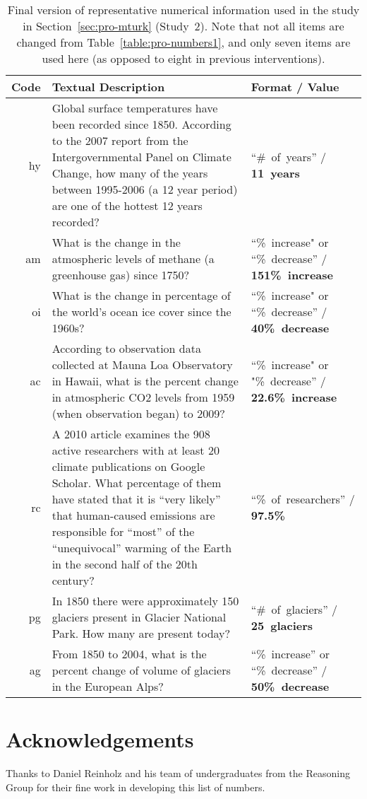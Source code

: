 \begin{table}
    \caption{Final version of representative numerical information used in the study in
        Section~\ref{sec:pro-mturk} (Study~2). Note that not all items are changed from
        Table~\ref{table:pro-numbers1}, and only seven items are used here (as
        opposed to eight in previous interventions).}
    \label{table:pro-numbers2}
    \begin{tabu}{>{\sffamily}rX[3]X[-1,l]}
        \toprule
        Code & Textual Description & Format / Value \\
        \midrule

hy &
Global surface temperatures have been recorded since 1850. According to the 2007
report from the Intergovernmental Panel on Climate Change, how many of the years
between 1995-2006 (a 12 year period) are one of the hottest 12 years recorded? &
“\#~of~years” /
\textbf{11~years} \\

am &
What is the change in the atmospheric levels of methane (a greenhouse gas) since
1750? &
“\%~increase" or “\%~decrease” /
\textbf{151\%~increase} \\

oi &
What is the change in percentage of the world's ocean ice cover since the 1960s?
&
“\%~increase" or “\%~decrease” /
\textbf{40\%~decrease} \\

ac &
According to observation data collected at Mauna Loa Observatory in Hawaii, what
is the percent change in atmospheric CO2 levels from 1959 (when observation
began) to 2009? &
“\%~increase" or "\%~decrease” /
\textbf{22.6\%~increase} \\

rc &
A 2010 article examines the 908 active researchers with at least 20 climate
publications on Google Scholar. What percentage of them have stated that it is
“very likely” that human-caused emissions are responsible for “most” of the
“unequivocal” warming of the Earth in the second half of the 20th century? &
“\%~of~researchers” /
\textbf{97.5\%} \\

pg &
In 1850 there were approximately 150 glaciers present in Glacier National Park.
How many are present today? &
“\#~of~glaciers” /
\textbf{25~glaciers} \\

ag &
From 1850 to 2004, what is the percent change of volume of glaciers in the
European Alps? &
“\%~increase” or “\%~decrease” /
\textbf{50\%~decrease} \\

\bottomrule
\end{tabu}
\end{table}

\section*{Acknowledgements}

Thanks to Daniel Reinholz and his team of undergraduates from the Reasoning
Group for their fine work in developing this list of numbers.
